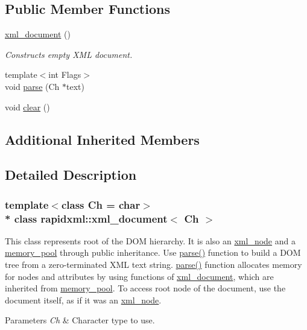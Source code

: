\subsection*{Public Member Functions}
\begin{DoxyCompactItemize}
\item 
\hyperlink{classrapidxml_1_1xml__document_aae8841b15085ba8f32ff46587ace28f5}{xml\+\_\+document} ()\hypertarget{classrapidxml_1_1xml__document_aae8841b15085ba8f32ff46587ace28f5}{}\label{classrapidxml_1_1xml__document_aae8841b15085ba8f32ff46587ace28f5}

\begin{DoxyCompactList}\small\item\em Constructs empty X\+ML document. \end{DoxyCompactList}\item 
{\footnotesize template$<$int Flags$>$ }\\void \hyperlink{classrapidxml_1_1xml__document_ac6e73ff9ac323bf5a370c38feb03a6b1}{parse} (Ch $\ast$text)
\item 
void \hyperlink{classrapidxml_1_1xml__document_a826929ff54242532198701f19ff5f83f}{clear} ()
\end{DoxyCompactItemize}
\subsection*{Additional Inherited Members}


\subsection{Detailed Description}
\subsubsection*{template$<$class Ch = char$>$\\*
class rapidxml\+::xml\+\_\+document$<$ Ch $>$}

This class represents root of the D\+OM hierarchy. It is also an \hyperlink{classrapidxml_1_1xml__node}{xml\+\_\+node} and a \hyperlink{classrapidxml_1_1memory__pool}{memory\+\_\+pool} through public inheritance. Use \hyperlink{classrapidxml_1_1xml__document_ac6e73ff9ac323bf5a370c38feb03a6b1}{parse()} function to build a D\+OM tree from a zero-\/terminated X\+ML text string. \hyperlink{classrapidxml_1_1xml__document_ac6e73ff9ac323bf5a370c38feb03a6b1}{parse()} function allocates memory for nodes and attributes by using functions of \hyperlink{classrapidxml_1_1xml__document}{xml\+\_\+document}, which are inherited from \hyperlink{classrapidxml_1_1memory__pool}{memory\+\_\+pool}. To access root node of the document, use the document itself, as if it was an \hyperlink{classrapidxml_1_1xml__node}{xml\+\_\+node}. 
\begin{DoxyParams}{Parameters}
{\em Ch} & Character type to use. \\
\hline
\end{DoxyParams}



